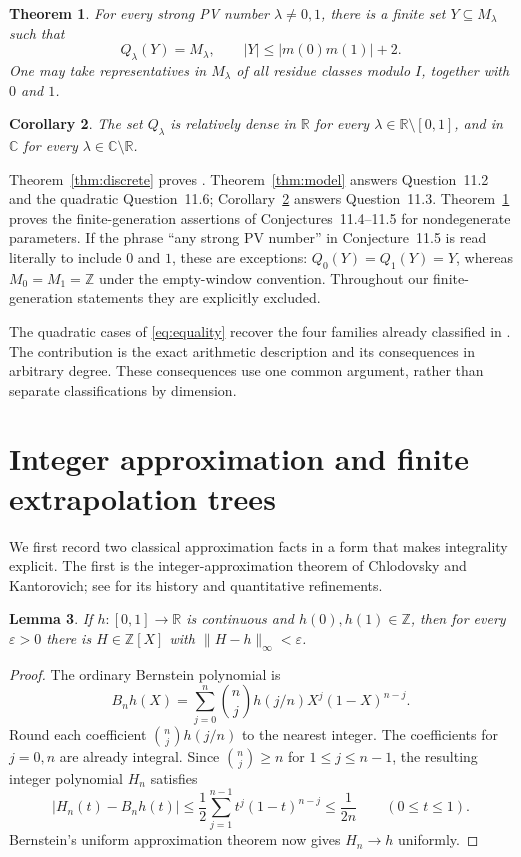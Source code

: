\documentclass[11pt]{article}
\newtheorem{theorem}{Theorem}
\newtheorem{lemma}[theorem]{Lemma}
\newtheorem{corollary}[theorem]{Corollary}
\theoremstyle{remark}
\newcommand{\Z}{\mathbb Z}
\newcommand{\R}{\mathbb R}
\newcommand{\C}{\mathbb C}
\begin{document}
\begin{theorem}\label{thm:finite}
For every strong PV number $\lambda\ne0,1$, there is a finite set $Y\subseteq M_\lambda$ such that
\[
 Q_\lambda(Y)=M_\lambda,\qquad
 |Y|\le |m(0)m(1)|+2.
\]
One may take representatives in $M_\lambda$ of all residue classes modulo $I$, together with $0$ and $1$.
\end{theorem}

\begin{corollary}\label{cor:relative}
The set $Q_\lambda$ is relatively dense in $\R$ for every $\lambda\in\R\setminus[0,1]$, and in $\C$ for every $\lambda\in\C\setminus\R$.
\end{corollary}

Theorem~\ref{thm:discrete} proves \cite[Conjecture~11.1]{FGH2026}. Theorem~\ref{thm:model} answers Question~11.2 and the quadratic Question~11.6; Corollary~\ref{cor:relative} answers Question~11.3. Theorem~\ref{thm:finite} proves the finite-generation assertions of Conjectures~11.4--11.5 for nondegenerate parameters. If the phrase ``any strong PV number'' in Conjecture~11.5 is read literally to include $0$ and $1$, these are exceptions: $Q_0(Y)=Q_1(Y)=Y$, whereas $M_0=M_1=\Z$ under the empty-window convention. Throughout our finite-generation statements they are explicitly excluded.

The quadratic cases of \eqref{eq:equality} recover the four families already classified in \cite[Theorem~6.9]{FGH2026}. The contribution is the exact arithmetic description and its consequences in arbitrary degree. These consequences use one common argument, rather than separate classifications by dimension.

\section{Integer approximation and finite extrapolation trees}
We first record two classical approximation facts in a form that makes integrality explicit. The first is the integer-approximation theorem of Chlodovsky and Kantorovich; see \cite{GL} for its history and quantitative refinements.

\begin{lemma}\label{lem:approx}
If $h:[0,1]\to\R$ is continuous and $h(0),h(1)\in\Z$, then for every $\varepsilon>0$ there is $H\in\Z[X]$ with $\|H-h\|_\infty<\varepsilon$.
\end{lemma}
\begin{proof}
The ordinary Bernstein polynomial is
\[
 B_nh(X)=\sum_{j=0}^n\binom nj h(j/n)X^j(1-X)^{n-j}.
\]
Round each coefficient $\binom njh(j/n)$ to the nearest integer. The coefficients for $j=0,n$ are already integral. Since $\binom nj\ge n$ for $1\le j\le n-1$, the resulting integer polynomial $H_n$ satisfies
\[
 |H_n(t)-B_nh(t)|
 \le\frac12\sum_{j=1}^{n-1}t^j(1-t)^{n-j}
 \le\frac1{2n}\qquad(0\le t\le1).
\]
Bernstein's uniform approximation theorem now gives $H_n\to h$ uniformly.
\end{proof}
\end{document}
